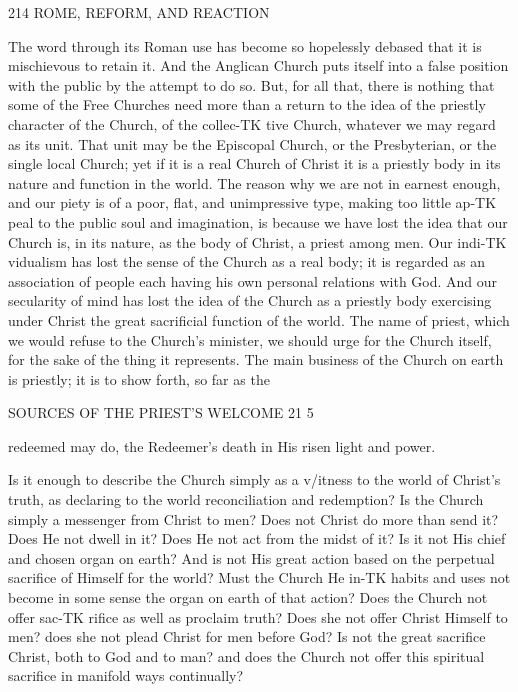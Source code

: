 \documentclass[12pt,a5paper,twoside]{book}
\begin{document}
{{214 ROME, REFORM, AND REACTION 

The word through its Roman use has become so 
hopelessly debased that it is mischievous to retain it. 
And the Anglican Church puts itself into a false 
position with the public by the attempt to do so. 
But, for all that, there is nothing that some of the 
Free Churches need more than a return to the idea 
of the priestly character of the Church, of the collec-TK
tive Church, whatever we may regard as its unit. 
That unit may be the Episcopal Church, or the 
Presbyterian, or the single local Church; yet if it is 
a real Church of Christ it is a priestly body in its 
nature and function in the world. The reason why 
we are not in earnest enough, and our piety is of a 
poor, flat, and unimpressive type, making too little ap-TK
peal to the public soul and imagination, is because we 
have lost the idea that our Church is, in its nature, as 
the body of Christ, a priest among men. Our indi-TK
vidualism has lost the sense of the Church as a real 
body; it is regarded as an association of people each 
having his own personal relations with God. And 
our secularity of mind has lost the idea of the Church 
as a priestly body exercising under Christ the great 
sacrificial function of the world. The name of priest, 
which we would refuse to the Church's minister, we 
should urge for the Church itself, for the sake of the 
thing it represents. The main business of the Church 
on earth is priestly; it is to show forth, so far as the 



SOURCES OF THE PRIEST'S WELCOME 21 5 

redeemed may do, the Redeemer's death in His risen 
light and power. 

Is it enough to describe the Church simply as a 
v/itness to the world of Christ's truth, as declaring to 
the world reconciliation and redemption? Is the 
Church simply a messenger from Christ to men? 
Does not Christ do more than send it? Does He not 
dwell in it? Does He not act from the midst of it? 
Is it not His chief and chosen organ on earth? And 
is not His great action based on the perpetual sacrifice 
of Himself for the world? Must the Church He in-TK
habits and uses not become in some sense the organ on 
earth of that action? Does the Church not offer sac-TK
rifice as well as proclaim truth? Does she not offer 
Christ Himself to men? does she not plead Christ for 
men before God? Is not the great sacrifice Christ, both 
to God and to man? and does the Church not offer 
this spiritual sacrifice in manifold ways continually? 

}}
\end{document}
